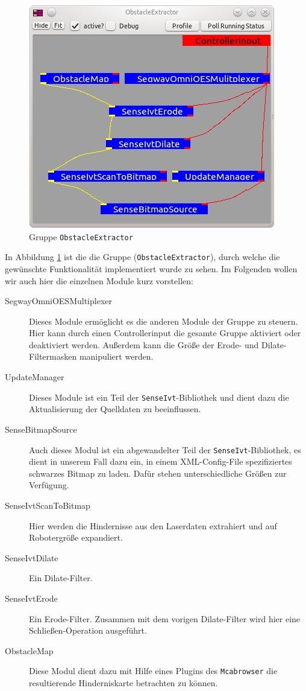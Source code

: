 \begin{figure}[h]
\center
\includegraphics[scale=0.8]{graphics/ObstacleExtractor.jpg}
\caption{\label{fig:obstacleExtractor} Gruppe \lstinline{ObstacleExtractor}}
\end{figure}
 In Abbildung \ref{fig:obstacleExtractor} ist die die Gruppe
 (\lstinline{ObstacleExtractor}), durch welche die gewünschte Funktionalität implementiert wurde zu sehen.
 Im Folgenden wollen wir auch hier die einzelnen Module kurz vorstellen:

\begin{description}
\item[SegwayOmniOESMultiplexer] Dieses Module ermöglicht es die anderen Module der Gruppe zu steuern.
 Hier kann durch einen Controllerinput die gesamte Gruppe aktiviert oder deaktiviert werden.
 Außerdem kann die Größe der Erode- und Dilate-Filtermasken manipuliert werden.
\item[UpdateManager] Dieses Module ist ein Teil der
\lstinline{SenseIvt}-Bibliothek und dient dazu die Aktualisierung der Quelldaten
zu beeinflussen.
\item[SenseBitmapSource] Auch dieses Modul ist ein abgewandelter Teil der
\lstinline{SenseIvt}-Bibliothek, es dient in unserem Fall dazu ein, in einem
 XML-Config-File spezifiziertes schwarzes Bitmap zu laden.
 Dafür stehen unterschiedliche Größen zur Verfügung.
\item[SenseIvtScanToBitmap] Hier werden die Hindernisse aus den Laserdaten extrahiert und auf Robotergröße expandiert.
\item[SenseIvtDilate] Ein Dilate-Filter.
\item[SenseIvtErode] Ein Erode-Filter. Zusammen mit dem vorigen Dilate-Filter
wird hier eine Schlie\-ßen-Operation ausgeführt.
\item[ObstacleMap] Diese Modul dient dazu mit Hilfe eines Plugins des
\lstinline{Mcabrowser} die resultierende Hinderniskarte betrachten zu können.
\end{description}

